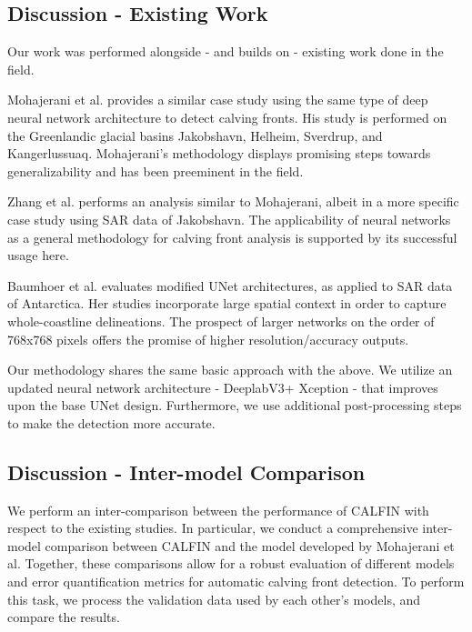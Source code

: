 \documentclass[tc, manuscript]{copernicus}
\begin{document}
\subsection{Discussion - Existing Work}
Our work was performed alongside - and builds on - existing work done in the field.

Mohajerani et al.\citep{mohajerani2019} provides a similar case study using the same type of deep neural network architecture to detect calving fronts. His study is performed on the Greenlandic glacial basins Jakobshavn, Helheim, Sverdrup, and Kangerlussuaq. Mohajerani's methodology displays promising steps towards generalizability and has been preeminent in the field.

Zhang et al.\citep{zhang2019} performs an analysis similar to Mohajerani, albeit in a more specific case study using SAR data of Jakobshavn. The applicability of neural networks as a general methodology for calving front analysis is supported by its successful usage here. 

Baumhoer et al.\citep{baumhoer2019} evaluates modified UNet architectures, as applied to SAR data of Antarctica. Her studies incorporate large spatial context in order to capture whole-coastline delineations. The prospect of larger networks on the order of 768x768 pixels offers the promise of higher resolution/accuracy outputs.

Our methodology shares the same basic approach with the above. We utilize an updated neural network architecture - DeeplabV3+ Xception - that improves upon the base UNet design. Furthermore, we use additional post-processing steps to make the detection more accurate.

\subsection{Discussion - Inter-model Comparison}
We perform an inter-comparison between the performance of CALFIN with respect to the existing studies. In particular, we conduct a comprehensive inter-model comparison between CALFIN and the model developed by Mohajerani et al. Together, these comparisons allow for a robust evaluation of different models and error quantification metrics for automatic calving front detection. To perform this task, we process the validation data used by each other's models, and compare the results.
\end{document}

